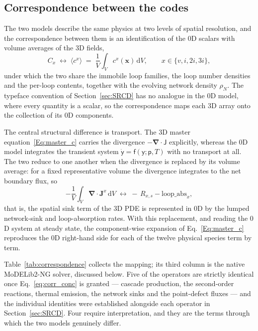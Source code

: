 \documentclass{article}
\newcommand{\spvec}[1]{\bm{\mathsf{#1}}}   %
\newcommand{\MoDNG}{\textsf{MoDELib2-NG}}
\begin{document}
\subsection{Correspondence between the codes}
\label{sec:correspondence}

The two models describe the same physics at two levels of spatial resolution, and
the correspondence between them is an identification of the $0$D scalars with
volume averages of the $3$D fields,
\begin{equation}\label{eq:corr_conc}
C_x \;\longleftrightarrow\; \langle c^x\rangle \;=\; \frac{1}{V}\int_V c^x(\bm x)\,\mathrm dV ,\qquad x\in\{v,i,2i,3i\},
\end{equation}
under which the two share the immobile loop families, the loop number densities and
the per-loop contents, together with the evolving network density $\rho_N$. The
typeface convention of Section~\ref{sec:SRCD} has no analogue in the $0$D model,
where every quantity is a scalar, so the correspondence maps each $3$D array onto
the collection of its $0$D components.

The central structural difference is transport. The $3$D master
equation~\eqref{Eq:master_c} carries the divergence $-\bm\nabla\cdot\spvec{J}$
explicitly, whereas the $0$D model integrates the transient system
$\dot{\spvec{y}}=\spvec f(\spvec y;\spvec p,T)$ with no transport at all. The two
reduce to one another when the divergence is replaced by its volume average: for a
fixed representative volume the divergence integrates to the net boundary flux, so
\begin{equation}\label{eq:corr_divergence}
-\frac{1}{V}\int_V \bm\nabla\cdot\bm J^x\,\mathrm dV \;\longleftrightarrow\; -\,R_{x,s}-\text{loop\_abs}_x ,
\end{equation}
that is, the spatial sink term of the $3$D PDE is represented in $0$D by the lumped
network-sink and loop-absorption rates. With this replacement, and reading the $0$D
system at steady state, the component-wise expansion of Eq.~\eqref{Eq:master_c}
reproduces the $0$D right-hand side for each of the twelve physical species term by
term.

Table~\ref{tab:correspondence} collects the mapping; its third column is the
native {\MoDNG} solver, discussed below. Five of the operators are
strictly identical once Eq.~\eqref{eq:corr_conc} is granted --- cascade production,
the second-order reactions, thermal emission, the network sinks and the
point-defect fluxes --- and the individual identities were established alongside
each operator in Section~\ref{sec:SRCD}. Four require interpretation, and they are
the terms through which the two models genuinely differ.
\end{document}
